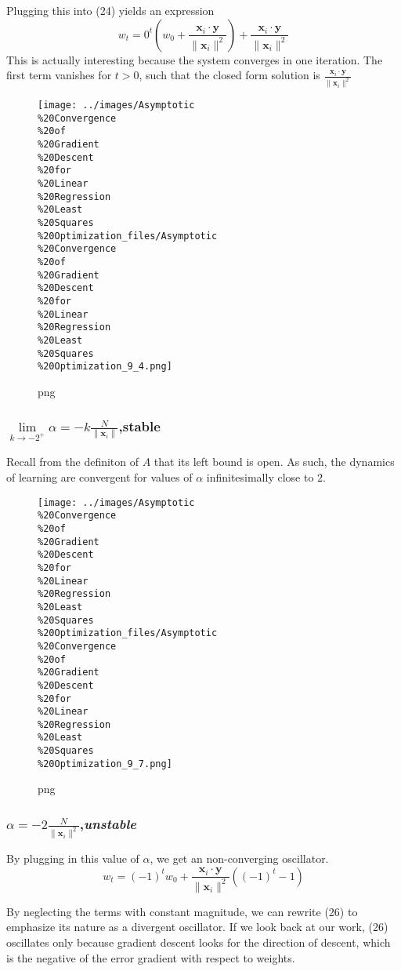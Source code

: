 \documentclass[]{article}
\begin{document}
Plugging this into (24) yields an expression \[
w_t = 0^t\left(w_0 + \frac{\mathbf{x}_i\cdot\mathbf{y}}{\|\mathbf{x}_i\|^2}\right)+\frac{\mathbf{x}_i\cdot\mathbf{y}}{\|\mathbf{x}_i\|^2}
\] This is actually interesting because the system converges in one
iteration. The first term vanishes for \(t>0\), such that the closed
form solution is
\(\frac{\mathbf{x}_i\cdot\mathbf{y}}{\|\mathbf{x}_i\|^2}\)

\begin{figure}[htbp]
\centering
\texttt{[image: ../images/Asymptotic\\\%20Convergence\\\%20of\\\%20Gradient\\\%20Descent\\\%20for\\\%20Linear\\\%20Regression\\\%20Least\\\%20Squares\\\%20Optimization\_files/Asymptotic\\\%20Convergence\\\%20of\\\%20Gradient\\\%20Descent\\\%20for\\\%20Linear\\\%20Regression\\\%20Least\\\%20Squares\\\%20Optimization\_9\_4.png]}
\caption{png}
\end{figure}

\subsubsection{\(\lim\limits_{k \to -2^+} \alpha = -k\frac{N}{\|\mathbf{x}_i\|}\),\textbf{stable}}

Recall from the definiton of \(A\) that its left bound is open. As such,
the dynamics of learning are convergent for values of \(\alpha\)
infinitesimally close to \(2\).

\begin{figure}[htbp]
\centering
\texttt{[image: ../images/Asymptotic\\\%20Convergence\\\%20of\\\%20Gradient\\\%20Descent\\\%20for\\\%20Linear\\\%20Regression\\\%20Least\\\%20Squares\\\%20Optimization\_files/Asymptotic\\\%20Convergence\\\%20of\\\%20Gradient\\\%20Descent\\\%20for\\\%20Linear\\\%20Regression\\\%20Least\\\%20Squares\\\%20Optimization\_9\_7.png]}
\caption{png}
\end{figure}

\subsubsection{\(\alpha = -2\frac{N}{\|\mathbf{x}_i\|^2}\),\emph{unstable}}{}

By plugging in this value of \(\alpha\), we get an non-converging oscillator. \[
w_t =(-1)^t w_0 + \frac{\mathbf{x}_i \cdot \mathbf{y}}{\|\mathbf{x}_i\|^2}\left((-1)^t -1\right)
\]

By neglecting the terms with constant magnitude, we can rewrite (26) to
emphasize its nature as a divergent oscillator. If we look back at our
work, (26) oscillates only because gradient descent looks for the
direction of descent, which is the negative of the error gradient with
respect to weights.
\end{document}
